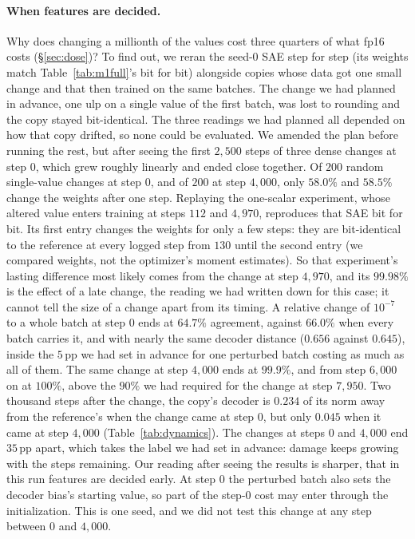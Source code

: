 \documentclass{article}
\begin{document}
\paragraph{When features are decided.} Why does changing a millionth of
the values cost three quarters of what fp16 costs (\S\ref{sec:dose})? To find out, we
reran the seed-0 SAE step for step (its weights match
Table~\ref{tab:m1full}'s bit for bit) alongside copies whose data got
one small change and that then trained on the same batches. The change
we had planned in advance, one ulp on a single value of the first
batch, was lost to rounding and the copy stayed bit-identical. The
three readings we had planned all depended on how that copy drifted, so
none could be evaluated. We amended the plan before running the rest,
but after seeing the first $2{,}500$ steps of three dense changes at
step $0$, which grew roughly linearly and ended close together.
Of $200$ random single-value changes at step $0$, and of $200$ at step
$4{,}000$, only $58.0\%$ and $58.5\%$ change the weights after one step.
Replaying the one-scalar experiment, whose altered value enters
training at steps $112$ and $4{,}970$, reproduces that SAE bit for bit.
Its first entry changes the weights for only a few steps: they are
bit-identical to the reference at every logged step from $130$ until
the second entry (we compared weights, not the optimizer's moment
estimates). So that experiment's lasting difference most likely comes
from the change at step $4{,}970$, and its $99.98\%$ is the effect of a
late change, the reading we had written down for this case; it cannot
tell the size of a change apart from its timing. A relative change of
$10^{-7}$ to a whole batch at step $0$ ends at $64.7\%$ agreement,
against $66.0\%$ when every batch carries it, and with nearly the same
decoder distance ($0.656$ against $0.645$), inside the $5$\,pp we had
set in advance for one perturbed batch costing as much as all of them.
The same change at step $4{,}000$ ends at $99.9\%$, and from step
$6{,}000$ on at $100\%$, above the $90\%$ we had required for the change
at step $7{,}950$. Two thousand steps after the change, the copy's decoder is
$0.234$ of its norm away from the reference's when the change came at
step $0$, but only $0.045$ when it came at step $4{,}000$
(Table~\ref{tab:dynamics}). The changes at steps $0$ and $4{,}000$ end
$35$\,pp apart, which takes the label we had set in advance: damage keeps
growing with the steps remaining. Our reading after seeing the results
is sharper, that in this run features are decided early. At step $0$
the perturbed batch also sets the decoder bias's starting value, so
part of the step-$0$ cost may enter through the initialization. This is
one seed, and we did not test this change at any step between $0$ and
$4{,}000$.
\end{document}
